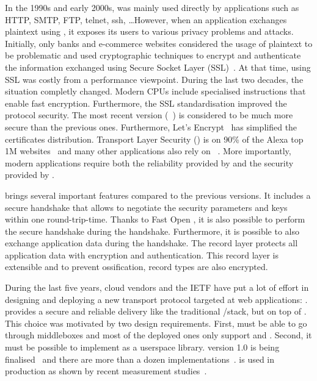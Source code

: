 In the 1990s and early 2000s, \tcp was mainly used directly by applications such
as HTTP, SMTP, FTP, telnet, ssh, \ldots However, when an application exchanges
plaintext using \tcp, it exposes its users to various privacy problems and
attacks. Initially, only banks and e-commerce websites considered the usage of
plaintext to be problematic and used cryptographic techniques to encrypt and
authenticate the information exchanged using Secure Socket Layer
(SSL)~\cite{draft-hickman-netscape-ssl}. At that time, using SSL was costly from
a performance viewpoint. During the last two decades, the situation completly
changed. Modern CPUs include specialised instructions that enable fast
encryption. Furthermore, the SSL standardisation improved the protocol security.
The most recent version (~\cite{rfc8446}) is considered to be much more
secure than the previous ones. Furthermore, Let's Encrypt~\cite{aas2019let} has
simplified the certificates distribution. Transport Layer Security (\tls) is on
90\% of the Alexa top 1M websites~\cite{holz2019era,holz2020tracking} and many
other applications also rely on \tls~\cite{anderson2019tls}. More importantly,
modern applications require both the reliability provided by \tcp and the
security provided by \tls.

 brings several important features compared to the previous versions. It
includes a secure handshake that allows to negotiate the security parameters and
keys within one round-trip-time. Thanks to \tcp Fast Open
\cite{radhakrishnan2011tcp}, it is also possible to perform the secure handshake
during the \tcp handshake. Furthermore, it is possible to also exchange
application data during the handshake. The  record layer protects all
application data with encryption and authentication. This record layer is
extensible and to prevent ossification, \tls record types are also encrypted.





During the last five years, cloud vendors and the IETF have put a lot of effort
in designing and deploying a new transport protocol targeted at web
applications: \quic \cite{10.1145/3098822.3098842}. \quic provides a secure and
reliable delivery like the traditional \tls/\tcp stack, but on top of \udp. This
choice was motivated by two design requirements. First, \quic must be able to go
through middleboxes and most of the deployed ones only support \tcp and \udp.
Second, it must be possible to implement \quic as a userspace library. \quic
version 1.0 is being finalised~\cite{draft-ietf-quic-transport} and there are
more than a dozen implementations~\cite{quicimplem,marx2020same}. \quic is used
in production as shown by recent measurement studies~\cite{trevisan2020five}.

